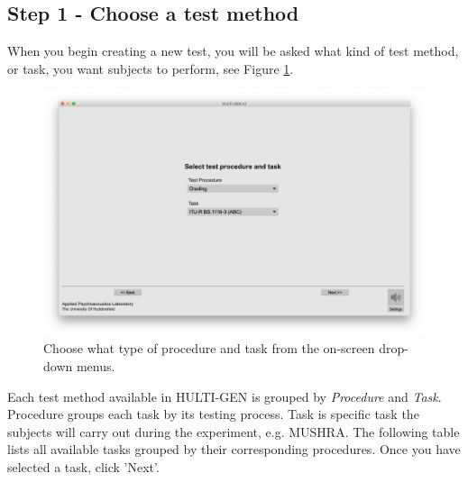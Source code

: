 \subsection{Step 1 - Choose a test method}
When you begin creating a new test, you will be asked what kind of test method, or task, you want subjects to perform, see Figure \ref{create::chooseTest}.

\begin{figure}[ht]
	\centering
	\includegraphics[width=1.0\textwidth]{./images/createTest_step02_chooseTest.png}
	\caption{Choose what type of procedure and task from the on-screen drop-down menus.}
	\label{create::chooseTest}
\end{figure}
\noindent
Each test method available in HULTI-GEN is grouped by \emph{Procedure} and \emph{Task}. Procedure groups each task by its testing process. Task is specific task the subjects will carry out during the experiment, e.g. MUSHRA. The following table lists all available tasks grouped by their corresponding procedures. Once you have selected a task, click 'Next'.

